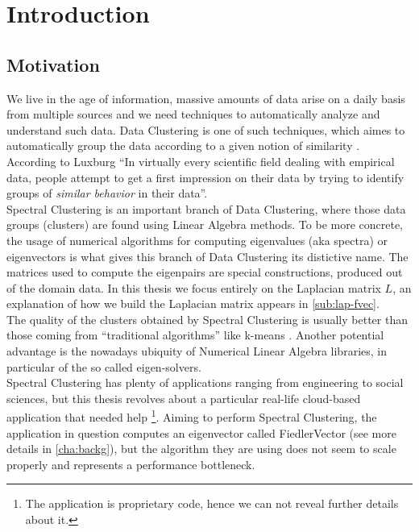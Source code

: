 \chapter{Introduction}

\section{Motivation}

We live in the age of information, massive amounts of data arise on a
daily basis from multiple sources and we need techniques to
automatically analyze and understand such data. Data Clustering is one
of such techniques, which aimes to automatically group the data
according to a given notion of similarity \cite{pang06}. According to
Luxburg \cite{luxburg07} ``In virtually every  
scientific field dealing with empirical data, people attempt to get a
first impression on their data by
trying to identify groups of \emph{similar behavior} in their
data''. \\

Spectral Clustering is an important branch of Data Clustering, where
those data groups (clusters) are found using Linear Algebra
methods. To be more concrete, the usage of numerical algorithms for computing
eigenvalues (aka spectra) or eigenvectors is what gives this branch of
Data Clustering its distictive  name. The matrices used to compute the
eigenpairs are special constructions, produced out of the domain
data. In this thesis we focus entirely on the \gls{Laplacian} matrix
$L$, an explanation of how we build the 
\gls{Laplacian} matrix appears in \cref{sub:lap-fvec}. \\

The quality of the clusters obtained by Spectral Clustering 
is usually better than those coming from ``traditional algorithms''
like k-means \cite{luxburg07}. Another potential advantage is the
nowadays ubiquity of Numerical Linear Algebra libraries, in particular
of the so called eigen-solvers. \\

Spectral Clustering has plenty of applications ranging from
engineering to social sciences, but this  
thesis revolves about a particular real-life cloud-based application
that needed help \footnote{The application is proprietary code, hence
  we can not 
  reveal further details about it.}. Aiming to perform Spectral
Clustering, the application in question
computes an eigenvector called \gls{FiedlerVector} (see more
details in \cref{cha:backg}), but the algorithm they are using does
not seem to scale properly and represents a performance bottleneck. 

